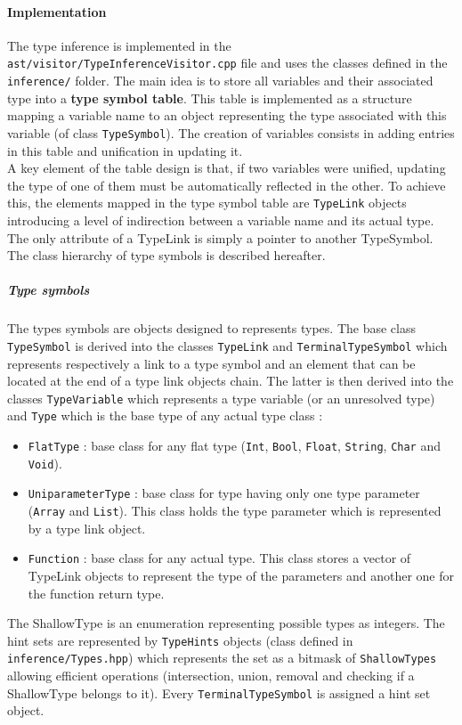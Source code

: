 \documentclass[a4paper,11pt]{article}
\begin{document}
\paragraph{Implementation} The type inference is implemented in the \texttt{ast/visitor/TypeInferenceVisitor.cpp} file and uses the classes defined in the \texttt{inference/} folder. The main idea is to store all variables and their associated type into a \textbf{type symbol table}. This table is implemented as a structure mapping a variable name to an object representing the type associated with this variable (of class \texttt{TypeSymbol}). The creation of variables consists in adding entries in this table and unification in updating it. \\ 
A key element of the table design is that, if two variables were unified, updating the type of one of them must be automatically reflected in the other. To achieve this, the elements mapped in the type symbol table are \texttt{TypeLink} objects introducing a level of indirection between a variable name and its actual type. The only attribute of a TypeLink is simply a pointer to another TypeSymbol. The class hierarchy of type symbols is described hereafter.
\subparagraph{Type symbols} The types symbols are objects designed to represents types. The base class \texttt{TypeSymbol} is derived into the classes \texttt{TypeLink} and \texttt{TerminalTypeSymbol} which represents respectively a link to a type symbol and an element that can be located at the end of a type link objects chain. The latter is then derived into the classes \texttt{TypeVariable} which represents a type variable (or an unresolved type) and \texttt{Type} which is the base type of any actual type class :
\begin{itemize}
	\item \texttt{FlatType} : base class for any flat type (\texttt{Int}, \texttt{Bool}, \texttt{Float}, \texttt{String}, \texttt{Char} and \texttt{Void}).
	\item \texttt{UniparameterType} : base class for type having only one type parameter (\texttt{Array} and \texttt{List}). This class holds the type parameter which is represented by a type link object. 
	\item \texttt{Function} : base class for any actual type. This class stores a vector of TypeLink objects to represent the type of the parameters and another one for the function return type.
\end{itemize}
The ShallowType is an enumeration representing possible types as integers. The hint sets are represented by \texttt{TypeHints} objects (class defined in \texttt{inference/Types.hpp}) which represents the set as a bitmask of \texttt{ShallowTypes} allowing efficient operations (intersection, union, removal and checking if a ShallowType belongs to it). Every \texttt{TerminalTypeSymbol} is assigned a hint set object.
\end{document}
